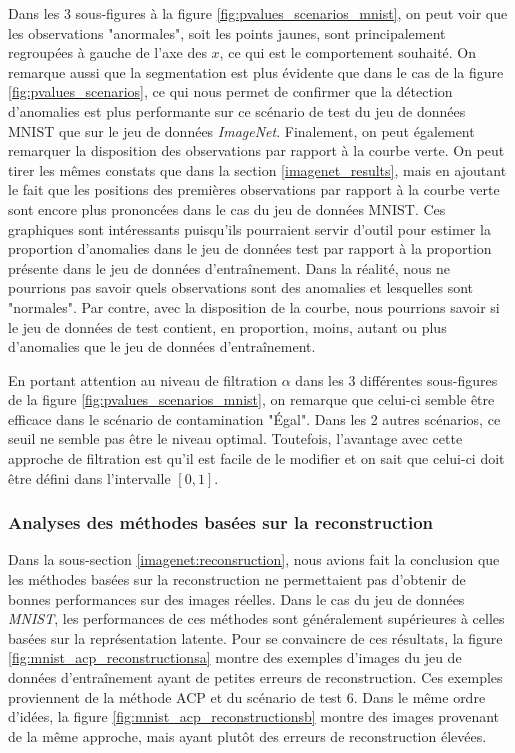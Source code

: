 Dans les 3 sous-figures à la figure \ref{fig:pvalues_scenarios_mnist}, on peut voir que les observations "anormales", soit les points jaunes, sont principalement regroupées à gauche de l'axe des $x$, ce qui est le comportement souhaité. On remarque aussi que la segmentation est plus évidente que dans le cas de la figure \ref{fig:pvalues_scenarios}, ce qui nous permet de confirmer que la détection d'anomalies est plus performante sur ce scénario de test du jeu de données MNIST que sur le jeu de données \textit{ImageNet}. Finalement, on peut également remarquer la disposition des observations par rapport à la courbe verte. On peut tirer les mêmes constats que dans la section \ref{imagenet_results}, mais en ajoutant le fait que les positions des premières observations par rapport à la courbe verte sont encore plus prononcées dans le cas du jeu de données MNIST. Ces graphiques sont intéressants puisqu'ils pourraient servir d'outil pour estimer la proportion d'anomalies dans le jeu de données test par rapport à la proportion présente dans le jeu de données d'entraînement. Dans la réalité, nous ne pourrions pas savoir quels observations sont des anomalies et lesquelles sont "normales". Par contre, avec la disposition de la courbe, nous pourrions savoir si le jeu de données de test contient, en proportion, moins, autant ou plus d'anomalies que le jeu de données d'entraînement.

En portant attention au niveau de filtration $\alpha$ dans les 3 différentes sous-figures de la figure \ref{fig:pvalues_scenarios_mnist}, on remarque que celui-ci semble être efficace dans le scénario de contamination "Égal". Dans les 2 autres scénarios, ce seuil ne semble pas être le niveau optimal. Toutefois, l'avantage avec cette approche de filtration est qu'il est facile de le modifier et on sait que celui-ci doit être défini dans l'intervalle $[0, 1]$.

\subsubsection{Analyses des méthodes basées sur la reconstruction} \label{mnist:reconsruction}

Dans la sous-section \ref{imagenet:reconsruction}, nous avions fait la conclusion que les méthodes basées sur la reconstruction ne permettaient pas d'obtenir de bonnes performances sur des images réelles. Dans le cas du jeu de données \textit{MNIST}, les performances de ces méthodes sont généralement supérieures à celles basées sur la représentation latente. Pour se convaincre de ces résultats, la figure \ref{fig:mnist_acp_reconstructionsa} montre des exemples d'images du jeu de données d'entraînement ayant de petites erreurs de reconstruction. Ces exemples proviennent de la méthode ACP et du scénario de test 6.  Dans le même ordre d'idées, la figure \ref{fig:mnist_acp_reconstructionsb} montre des images provenant de la même approche, mais ayant plutôt des erreurs de reconstruction élevées. 

